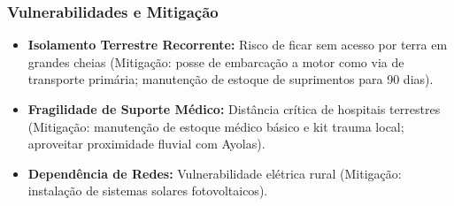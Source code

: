 \subsubsection{Vulnerabilidades e
Mitigação}

\begin{itemize}
\tightlist
\item
  \textbf{Isolamento Terrestre Recorrente:} Risco de ficar sem acesso
  por terra em grandes cheias (Mitigação: posse de embarcação a motor
  como via de transporte primária; manutenção de estoque de suprimentos
  para 90 dias).
\item
  \textbf{Fragilidade de Suporte Médico:} Distância crítica de hospitais
  terrestres (Mitigação: manutenção de estoque médico básico e kit
  trauma local; aproveitar proximidade fluvial com Ayolas).
\item
  \textbf{Dependência de Redes:} Vulnerabilidade elétrica rural
  (Mitigação: instalação de sistemas solares fotovoltaicos).
\end{itemize}


